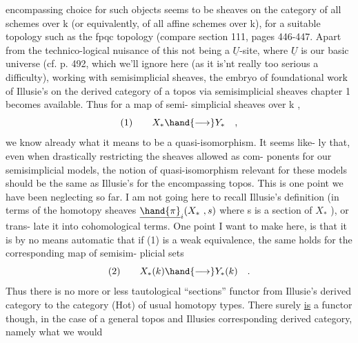 
encompassing choice for such objects seems to be sheaves on the category
of all schemes  over k (or equivalently,  of all affine schemes over
k),  for a suitable topology such as the fpqc topology  (compare section
111,  pages 446-447.  Apart from the technico-logical nuisance of this
not being a $\underline{U}$-site,  where $\underline{U}$ is our basic universe  (cf. p. 492,
which we'll ignore here (as it is'nt really too serious a difficulty),
 working with semisimplicial sheaves,  the embryo of foundational work
of Illusie's on the derived category of a topos via semisimplicial
sheaves\hand{[}  chapter 1\hand{]} becomes available.  Thus for a map of semi-
simplicial sheaves over k ,
\[
\text{(1)}\qquad X_{*} \hand{\longrightarrow} Y_{*} \quad ,
\]
we know already what it means to be a quasi-isomorphism. It seems like-%
ly that,  even when drastically restricting the sheaves allowed as com-%
ponents for our semisimplicial models,  the notion of quasi-isomorphism
relevant for these models should be the same as Illusie's\xout{\unsure{,}}  for the
encompassing topos.  This is one point we have been neglecting so far.
I am not going here to recall Illusie's definition (in terms of the
homotopy sheaves  $\underline{\hand{\pi}}_{i}(X_{*}\ , s)$  where s is a section of $X_{*}$ ),  or trans-
late it into cohomological terms.   One point I want to make here,  is
that it is by no means automatic  that  if (1) is a 
weak equivalence,  the same holds for the corresponding map of semisim-%
plicial sets
\[
\text{(2)}\qquad X_{*}(k) \hand{\longrightarrow} Y_{*}(k) \quad .
\]
Thus there is no  more or less tautological ``sections'' functor from
Illusie's derived category\xout{\unsure{,}} to the category (Hot) of usual homotopy
types. \hand{(}There surely \uline{is}  a  functor though,  in the case of a general
topos  and Illusies corresponding derived category,  namely what we would
